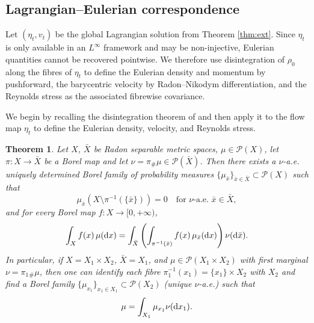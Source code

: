 \documentclass[10pt,reqno]{amsart}
\numberwithin{equation}{section}
\newtheorem{theorem}{Theorem}[section]
\newcommand{\lt}{\left}
\newcommand{\rt}{\right}
\newcommand{\calP}{\mathcal P}
\newcommand{\rd}{\textnormal{d}}
\newcommand{\dx}{\textnormal{d}x}
\begin{document}
 
%
%
%                      
%
%
\subsection{Lagrangian--Eulerian correspondence}\label{ssec:LEc}

Let $(\eta_t,v_t)$ be the global Lagrangian solution from Theorem \ref{thm:ext}. Since $\eta_t$ is only available in an $L^\infty$ framework and may be non-injective, Eulerian quantities cannot be recovered pointwise. We therefore use disintegration of $\rho_0$ along the fibres of $\eta_t$ to define the Eulerian density and momentum by pushforward, the barycentric velocity by Radon--Nikodym differentiation, and the Reynolds stress as the associated fibrewise covariance.  

We begin by recalling the disintegration theorem of \cite[Theorem 5.3.1]{AGS08} and then apply it to the flow map $\eta_t$ to define the Eulerian density, velocity, and Reynolds stress.

\begin{theorem}\label{thm:disint}
Let $X$, $\bar X$ be Radon separable metric spaces, $\mu \in \calP(X)$, let $\pi: X \to \bar X$ be a Borel map and let $\nu = \pi_\# \mu \in \calP(\bar X)$. Then there exists a $\nu$-a.e. uniquely determined Borel family of probability measures $\{\mu_{\bar x}\}_{\bar x \in \bar X} \subset \calP(X)$ such that
\[
\mu_{\bar x} (X \setminus \pi^{-1}(\{\bar x\})) = 0 \quad \text{for $\nu$-a.e. $\bar x \in \bar X$},
\]
and for every Borel map $f: X \to [0,+\infty)$,
\[
\int_X f(x)\,\mu(\dx) = \int_{\bar X} \lt(  \int_{\pi^{-1}(\bar x)} f(x) \,\mu_{\bar x}(\dx)\rt)  \nu(\rd\bar x).
\]
In particular, if $X = X_1 \times X_2$, $\bar X = X_1$, and $\mu \in \calP(X_1 \times X_2)$ with first marginal $\nu = \pi_1 {}_\# \mu$, then one can identify each fibre $\pi_1^{-1}(x_1) = \{x_1\} \times X_2$ with $X_2$ and find a Borel family $\{\mu_{x_1}\}_{x_1 \in X_1} \subset \calP(X_2)$ (unique $\nu$-a.e.) such that
\[
\mu = \int_{X_1} \mu_{x_1} \nu(\rd x_1).
\]
\end{theorem} 
\end{document}
